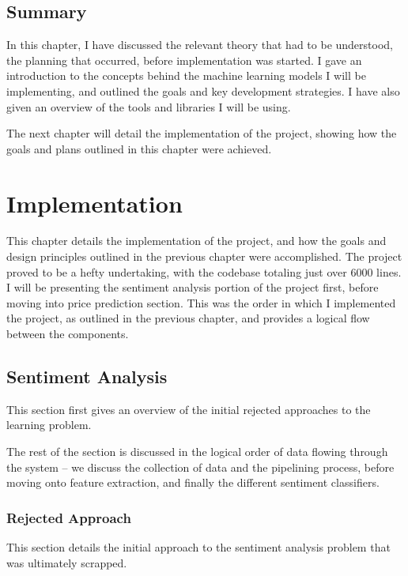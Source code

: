 \documentclass[12pt,a4paper,twoside,openright]{report}
\begin{document}
\section{Summary}
\label{sec:prepSumm}

In this chapter, I have discussed the relevant theory that had to be understood, the planning
that occurred, before implementation was started. I gave an introduction to the concepts
behind the machine learning models I will be implementing, and outlined the goals and
key development strategies. I have also given an overview of the tools and libraries I
will be using.

The next chapter will detail the implementation of the project, showing how the goals and
plans outlined in this chapter were achieved.

\chapter{Implementation}
\label{sec:imp}

This chapter details the implementation of the project, and how the goals and
design principles outlined in the previous chapter were accomplished. The project proved
to be a hefty undertaking, with the codebase totaling just over 6000 lines. I will be
presenting the sentiment analysis portion of the project first, before moving into price
prediction section. This was the order in which I implemented the project, as outlined
in the previous chapter, and provides a logical flow between the components.

\section{Sentiment Analysis}
\label{sec:impSenti}
This section first gives an overview of the initial rejected approaches to the
learning problem.

The rest of the section is discussed in the logical order of data flowing through the system --
we discuss the collection of data and the pipelining process, before
moving onto feature extraction, and finally the different sentiment classifiers.

\subsection{Rejected Approach}
\label{sec:impFailed}

This section details the initial approach to the sentiment analysis problem
that was ultimately scrapped.
\end{document}
